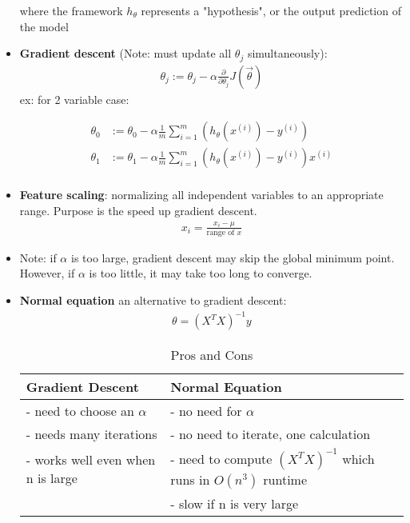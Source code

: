 \documentclass[titlepage]{article}
\begin{document}
\begin{itemize}
	where the framework $h_ \theta$ represents a "hypothesis", or the output prediction of the model
	
	\item \textbf{Gradient descent} (Note: must update all $\theta_j$ simultaneously):
	\begin{align*}
		\theta_j := \theta_j - \alpha \frac{\partial}{\partial \theta_j} J(\vec \theta)
	\end{align*}
	ex: for 2 variable case:
	
	
	\begin{align*}
		\theta_0 &:= \theta_0 - \alpha \frac{1}{m}\sum_{i=1}^{m} (h_\theta(x^{(i)}) - y^{(i)}) \\
		\theta_1 &:= \theta_1 - \alpha \frac{1}{m}\sum_{i=1}^{m} (h_\theta(x^{(i)}) - y^{(i)}) x^{(i)} \\
	\end{align*}
	
	\item \textbf{Feature scaling}: normalizing all independent variables to an appropriate range. Purpose is the speed up gradient descent.
	\begin{align*}
	x_i = \frac{x_i-\mu}{\text{range of } x}
	\end{align*}
	
	\item Note: if $\alpha$ is too large, gradient descent may skip the global minimum point. However, if $\alpha$ is too little, it may take too long to converge.
	
	
	\item \textbf{Normal equation} an alternative to gradient descent:
	\begin{align*}
		\theta = (X^TX)^{-1}y
	\end{align*}

\FloatBarrier
\begin{table} [!htbp]
	\centering
	\begin{tabular}{p{5cm}|p{6cm}}
		\textbf{Gradient Descent} & \textbf{Normal Equation}\\
		\hline
		- need to choose an $\alpha$ & - no need for $\alpha$\\
		- needs many iterations & - no need to iterate, one calculation\\
		- works well even when n is large & - need to compute $(X^TX)^{-1}$ which runs in $O(n^3)$ runtime\\
		& - slow if n is very large
	\end{tabular}
	
	\caption{Pros and Cons}
\end{table}



\end{itemize}
\end{document}
